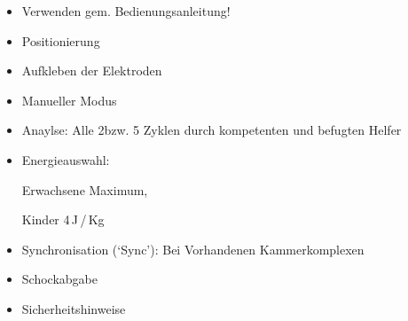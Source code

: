 {%
%
%

}{
\begin{itemize}
  \item Verwenden gem. Bedienungsanleitung!
  \item Positionierung
  \item Aufkleben der Elektroden
  \item Manueller Modus
  \item Anaylse: 
  Alle 2\Min* bzw. 5 Zyklen durch kompetenten und befugten Helfer
  \item Energieauswahl: 
  
  Erwachsene Maximum, 
  
  Kinder 4\,J\,/\,Kg
  \item Synchronisation (\enquote*{Sync}): 
  Bei Vorhandenen Kammerkomplexen
  \item Schockabgabe
  \item Sicherheitshinweise
\end{itemize}
}{}{}{}

